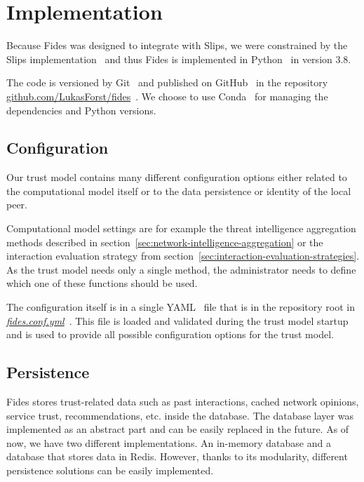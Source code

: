 \section{Implementation}
\label{sec:implementation}
Because Fides was designed to integrate with Slips, we were constrained by the Slips implementation~\cite{slips} and thus Fides is implemented in Python~\cite{python} in version 3.8.

The code is versioned by Git~\cite{git} and published on GitHub~\cite{github} in the repository \href{https://github.com/stratosphereips/fides}{github.com/LukasForst/fides}~\cite{fidesGithub}.
We choose to use Conda~\cite{conda} for managing the dependencies and Python versions.

\subsection{Configuration}
\label{subsec:configuration}
Our trust model contains many different configuration options either related to the computational model itself or to the data persistence or identity of the local peer.

Computational model settings are for example the threat intelligence aggregation methods described in section~\ref{sec:network-intelligence-aggregation} or the interaction evaluation strategy from section~\ref{sec:interaction-evaluation-strategies}.
As the trust model needs only a single method, the administrator needs to define which one of these functions should be used.

The configuration itself is in a single YAML~\cite{yaml} file that is in the repository root in \href{https://github.com/LukasForst/fides/blob/master/fides.conf.yml}{\textit{fides.conf.yml}}~\cite{fidesGithub}.
This file is loaded and validated during the trust model startup and is used to provide all possible configuration options for the trust model.

\subsection{Persistence}
\label{subsec:persistence}
Fides stores trust-related data such as past interactions, cached network opinions, service trust, recommendations, etc. inside the database.
The database layer was implemented as an abstract part and can be easily replaced in the future.
As of now, we have two different implementations. An in-memory database and a database that stores data in Redis.
However, thanks to its modularity, different persistence solutions can be easily implemented.

